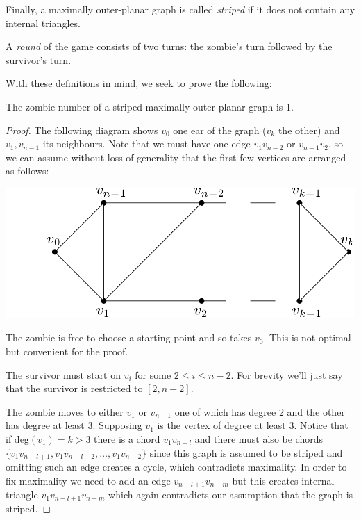\documentclass[letterpaper, 10pt]{article}
\begin{document}
\begin{definition}
Finally, a maximally outer-planar graph is called \emph{striped} if it does not
contain any internal triangles.
\end{definition}

\begin{definition}
A \emph{round} of the game consists of two turns: the zombie's turn followed by the survivor's turn.
\end{definition}

With these definitions in mind, we seek to prove the following:

\begin{lemma}
  The zombie number of a striped maximally outer-planar graph is 1.
\end{lemma}

\begin{proof}
  The following diagram shows $v_0$ one ear of the graph ($v_k$ the other) and $v_1, v_{n-1}$
  its neighbours. Note that we must have one edge $v_1v_{n-2}$ or $v_{n-1}v_2$,
  so we can assume without loss of generality that the first few vertices are
  arranged as follows:
  \begin{center}
  \includegraphics[scale=0.25]{striped1.png}
  \end{center}
  The zombie is free to choose a starting point and so takes $v_0$.
  This is not optimal but convenient for the proof.

  The survivor must start on $v_i$ for some $2 \leq i \leq n-2$.
  For brevity we'll just say that the survivor is restricted to $[2,n-2]$.

  The zombie moves to either $v_1$ or $v_{n-1}$ one of which has degree 2 and
  the other has degree at least 3. Supposing $v_1$ is the vertex of degree at least 3.
  Notice that if $\text{deg}(v_1)= k > 3$ there is a chord $v_1v_{n-l}$ and there must also be chords
  $\{v_1v_{n-l+1}, v_1v_{n-l+2}, \dots, v_1v_{n-2} \}$ since this graph is assumed
  to be striped and omitting such an edge creates a cycle, which contradicts maximality.
  In order to fix maximality we need to add an edge $v_{n-l+1}v_{{n-m}}$ but this creates
  internal triangle $v_1v_{n-l+1}v_{n-m}$ which again contradicts our assumption that the graph is striped.




\end{proof}
\end{document}
